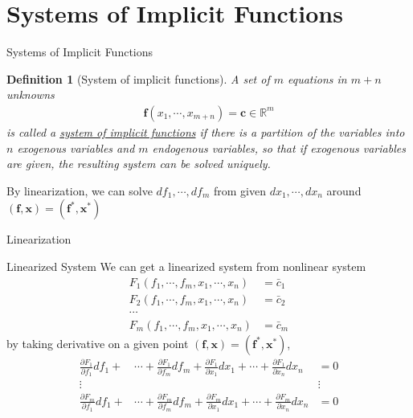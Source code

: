 \documentclass[final]{beamer}
\newtheorem{defn}{Definition}
\newcommand{\bb}{\mathbb}
\newcommand{\bd}{\mathbf}
\newcommand{\p}{\partial}
\begin{document}
\section{Systems of Implicit Functions} %
\label{sec:systems_of_implicit_functions}
\begin{frame}[t]{Systems of Implicit Functions}
	\begin{defn}
		[System of implicit functions] A set of $m$ equations in $m+n$ unknowns
		\begin{align*}
			\bd{f}(x_1,\cdots,x_{m+n}) = \bd c \in \bb{R}^m
		\end{align*}
		is called a \uline{system of implicit functions} if there is a partition of the variables into $n$ exogenous variables and $m$ endogenous variables, so that if exogenous variables are given, the resulting system can be solved uniquely.
	\end{defn}
		By linearization, we can solve $df_1,\cdots,df_m$ from given $dx_1,\cdots,dx_n$ around $(\bd{f},\bd{x})=(\bd{f}^\ast,\bd{x}^\ast)$
\end{frame}
\begin{frame}[t]{Linearization}
	\begin{block}
		{Linearized System}
		We can get a linearized system from nonlinear system
		\begin{align*}
			F_1(f_1,\cdots,f_m, x_1,\cdots,x_n) &= \bar c_1\\
			F_2(f_1,\cdots,f_m, x_1,\cdots,x_n) &= \bar c_2\\
			\cdots\\
			F_m(f_1,\cdots,f_m, x_1,\cdots,x_n) &= \bar c_m
		\end{align*}
		by taking derivative on a given point $(\bd{f},\bd{x})=(\bd{f}^\ast,\bd{x}^\ast)$,
		\begin{align*}
			\frac{\p F_1}{\p f_1}df_1 +
			&\cdots + \frac{\p F_1}{\p f_m}df_m + \frac{\p F_1}{\p x_1}dx_1 +
			\cdots + \frac{\p F_1}{\p x_n}dx_n
			&= 0 \\
			\vdots&
			&\vdots
			\\
			\frac{\p F_m}{\p f_1}df_1 +
			&\cdots + \frac{\p F_m}{\p f_m}df_m + \frac{\p F_m}{\p x_1}dx_1 + \cdots + \frac{\p F_m}{\p x_n}dx_n
			&= 0 \\
		\end{align*}
	\end{block}
\end{frame}
\end{document}
